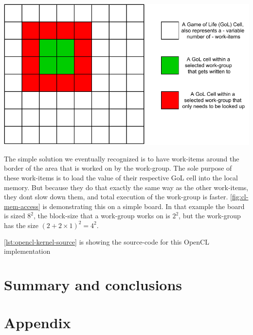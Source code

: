 \documentclass[a4paper,english,12pt,twoside=false]{scrartcl} %
\begin{document}
{
    \centering
    \label{fig:cl-mem-access}
    \includegraphics[width=\linewidth]{imgs/opencl_mem_access.drawio.pdf}
}

The simple solution we eventually recognized is to have work-items around the border of the area that is worked on by the work-group.
The sole purpose of these work-items is to load the value of their respective GoL cell into the local memory. 
But because they do that exactly the same way as the other work-items, they dont slow down them, and total execution of the work-group is faster.
\autoref{fig:cl-mem-access} is demonstrating this on a simple board. 
In that example the board is sized $8^2$, the block-size that a work-group works on is $2^2$, but the work-group has the size $(2 + 2\times 1)^2 = 4^2$.

\autoref{lst:opencl-kernel-source} is showing the source-code for this OpenCL implementation
{
    \centering
    \label{lst:opencl-kernel-source}
    
}

\section{Summary and conclusions}

\section{Appendix}
\end{document}
